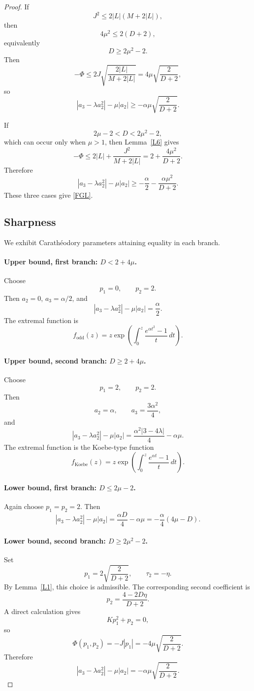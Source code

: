\documentclass[11pt,reqno]{amsart}
\numberwithin{equation}{section}
\begin{document}
\begin{proof}
If
\[
J^2\le2|L|(M+2|L|),
\]
then
\[
4\mu^2\le2(D+2),
\]
equivalently
\[
D\ge2\mu^2-2.
\]
Then
\[
-\Phi
\le
2J\sqrt{\frac{2|L|}{M+2|L|}}
=
4\mu\sqrt{\frac{2}{D+2}},
\]
so
\[
|a_3-\lambda a_2^2|-\mu|a_2|
\ge
-\alpha\mu\sqrt{\frac{2}{D+2}}.
\]

If
\[
2\mu-2<D<2\mu^2-2,
\]
which can occur only when $\mu>1$, then Lemma~\ref{L6} gives
\[
-\Phi
\le
2|L|+\frac{J^2}{M+2|L|}
=
2+\frac{4\mu^2}{D+2}.
\]
Therefore
\[
|a_3-\lambda a_2^2|-\mu|a_2|
\ge
-\frac{\alpha}{2}-\frac{\alpha\mu^2}{D+2}.
\]
These three cases give \eqref{FGL}.

\subsection*{Sharpness}
We exhibit Carath\'eodory parameters attaining equality in each branch.

\paragraph{Upper bound, first branch: $D<2+4\mu$.}
Choose
\[
p_1=0,\qquad p_2=2.
\]
Then $a_2=0$, $a_3=\alpha/2$, and
\[
|a_3-\lambda a_2^2|-\mu|a_2|
=
\frac{\alpha}{2}.
\]
The extremal function is
\[
f_{\mathrm{odd}}(z)
=
z\exp\left(\int_0^z\frac{e^{\alpha t^2}-1}{t}\,dt\right).
\]

\paragraph{Upper bound, second branch: $D\ge2+4\mu$.}
Choose
\[
p_1=2,\qquad p_2=2.
\]
Then
\[
a_2=\alpha,
\qquad
a_3=\frac{3\alpha^2}{4},
\]
and
\[
|a_3-\lambda a_2^2|-\mu|a_2|
=
\frac{\alpha^2|3-4\lambda|}{4}-\alpha\mu.
\]
The extremal function is the Koebe-type function
\[
f_{\mathrm{Koebe}}(z)
=
z\exp\left(\int_0^z\frac{e^{\alpha t}-1}{t}\,dt\right).
\]

\paragraph{Lower bound, first branch: $D\le2\mu-2$.}
Again choose $p_1=p_2=2$. Then
\[
|a_3-\lambda a_2^2|-\mu|a_2|
=
\frac{\alpha D}{4}-\alpha\mu
=
-\frac{\alpha}{4}(4\mu-D).
\]

\paragraph{Lower bound, second branch: $D\ge2\mu^2-2$.}
Set
\[
p_1=2\sqrt{\frac{2}{D+2}},
\qquad
\tau_2=-\eta.
\]
By Lemma~\ref{L1}, this choice is admissible. The corresponding second coefficient is
\[
p_2
=
\frac{4-2D\eta}{D+2}.
\]
A direct calculation gives
\[
Kp_1^2+p_2=0,
\]
so
\[
\Phi(p_1,p_2)
=
-J|p_1|
=
-4\mu\sqrt{\frac{2}{D+2}}.
\]
Therefore
\[
|a_3-\lambda a_2^2|-\mu|a_2|
=
-\alpha\mu\sqrt{\frac{2}{D+2}}.
\]


\end{proof}
\end{document}
